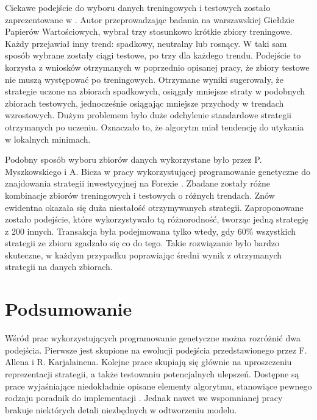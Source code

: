 \documentclass[twoside]{iisthesis}
\begin{document}
Ciekawe podejście do wyboru danych treningowych i testowych zostało zaprezentowane w \cite{GPW}. Autor przeprowadzając badania na warszawskiej Giełdzie Papierów Wartościowych, wybrał trzy stosunkowo krótkie zbiory treningowe. Każdy przejawiał inny trend: spadkowy, neutralny lub rosnący. W taki sam sposób wybrane zostały ciągi testowe, po trzy dla każdego trendu. Podejście to korzysta z wniosków otrzymanych w poprzednio opisanej pracy,  że zbiory testowe nie muszą występować po treningowych. Otrzymane wyniki sugerowały, że strategie uczone na zbiorach spadkowych, osiągały mniejsze straty w podobnych zbiorach testowych, jednocześnie osiągając mniejsze przychody w trendach wzrostowych. Dużym problemem było duże odchylenie standardowe strategii otrzymanych po uczeniu. Oznaczało to, że algorytm miał tendencję do utykania w lokalnych minimach.

Podobny sposób wyboru zbiorów danych wykorzystane było przez P. Myszkowskiego i A. Bicza w pracy wykorzystującej programowanie genetyczne do znajdowania strategii inwestycyjnej na Forexie \cite{Bicz}. Zbadane zostały różne kombinacje zbiorów treningowych i testowych o różnych trendach. Znów ewidentna okazała się duża niestałość otrzymywanych strategii. Zaproponowane zostało podejście, które wykorzystywało tą różnorodność, tworząc jedną strategię z 200 innych. Transakcja była podejmowana tylko wtedy, gdy 60\% wszystkich strategii ze zbioru zgadzało się co do tego. Takie rozwiązanie było bardzo skuteczne, w każdym przypadku poprawiając średni wynik z otrzymanych strategii na danych zbiorach.

\section{Podsumowanie}

Wśród prac wykorzystujących programowanie genetyczne można rozróżnić dwa podejścia. Pierwsze jest skupione na ewolucji podejścia przedstawionego przez  F. Allena i R. Karjalainena\cite{Allen1999245}. Kolejne prace skupiają się głównie na uproszczeniu reprezentacji strategii, a także testowaniu potencjalnych ulepszeń. Dostępne są prace wyjaśniające niedokładnie opisane elementy algorytmu, stanowiące pewnego rodzaju poradnik do implementacji \cite{5393324}. Jednak nawet we wspomnianej pracy brakuje niektórych detali niezbędnych w odtworzeniu modelu. 
\end{document}
